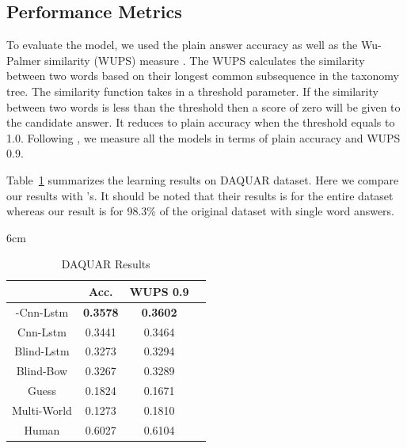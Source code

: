 \documentclass{article}
\renewcommand{\#}[1]{\textbf{#1}}
\begin{document}
\subsection{Performance Metrics}
To evaluate the model, we used the plain answer accuracy as well as the Wu-Palmer similarity (WUPS) measure \cite{wu94, malinowski14b}. The WUPS calculates the similarity between two words based on their longest common subsequence in the taxonomy tree. The similarity function takes in a threshold parameter. If the similarity between two words is less than the threshold then a score of zero will be given to the candidate answer. It reduces to plain accuracy when the threshold equals to 1.0. Following \cite{malinowski14b}, we measure all the models in terms of plain accuracy and WUPS 0.9.

Table~\ref{tab:daquar_results} summarizes the learning results on DAQUAR dataset. Here we compare our results with \cite{malinowski14b}'s. It should be noted that their results is for the entire dataset whereas our result is for 98.3\% of the original dataset with single word answers.

\begin{table}[h]
\caption{DAQUAR Results}
\label{tab:daquar_results}
\vskip 0.15in
\begin{center}
\begin{small}
\begin{sc}
\begin{minipage*}{6cm}
\begin{tabular}{c c c c}
\hline
\abovespace
\belowspace
            & Acc.     & WUPS 0.9 \\
\hline
\abovespace
2-Cnn-Lstm  &\#{0.3578}&\#{0.3602}\\
Cnn-Lstm    & 0.3441   & 0.3464   \\
Blind-Lstm  & 0.3273   & 0.3294   \\
Blind-Bow   & 0.3267   & 0.3289   \\
Guess       & 0.1824   & 0.1671   \\
\belowspace
Multi-World & 0.1273   & 0.1810   \\
\hline
\abovespace
\belowspace
Human       & 0.6027   &  0.6104  \\
\hline
\end{tabular}
\end{minipage*}
\end{sc}
\end{small}
\end{center}
\end{table}
\end{document}
